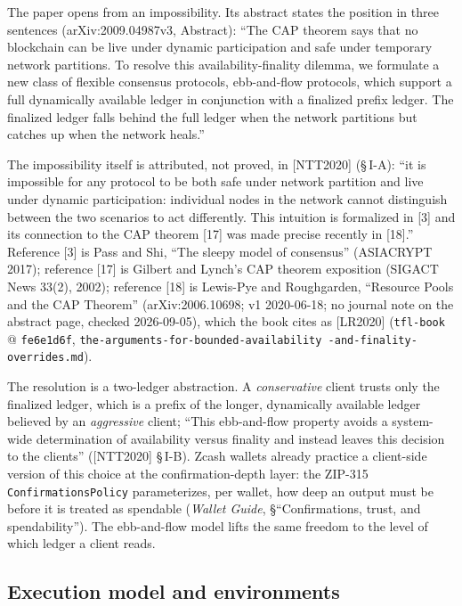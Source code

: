 \documentclass[11pt,a4paper]{article}
\theoremstyle{definition}
\begin{document}
The paper opens from an impossibility. Its abstract states the position in
three sentences (arXiv:2009.04987v3, Abstract): ``The CAP theorem says that
no blockchain can be live under dynamic participation and safe under
temporary network partitions. To resolve this availability-finality
dilemma, we formulate a new class of flexible consensus protocols,
ebb-and-flow protocols, which support a full dynamically available ledger
in conjunction with a finalized prefix ledger. The finalized ledger falls
behind the full ledger when the network partitions but catches up when the
network heals.''

The impossibility itself is attributed, not proved, in [NTT2020]
(\S\,I-A): ``it is impossible for any protocol to be both safe under
network partition and live under dynamic participation: individual nodes
in the network cannot distinguish between the two scenarios to act
differently. This intuition is formalized in [3] and its connection to the
CAP theorem [17] was made precise recently in [18].'' Reference [3] is
Pass and Shi, ``The sleepy model of consensus'' (ASIACRYPT 2017);
reference [17] is Gilbert and Lynch's CAP theorem exposition (SIGACT News
33(2), 2002); reference [18] is Lewis-Pye and Roughgarden, ``Resource
Pools and the CAP Theorem'' (arXiv:2006.10698; v1 2020-06-18; no journal
note on the abstract page, checked 2026-09-05), which the book cites as
[LR2020] (\texttt{tfl-book} @ \texttt{fe6e1d6f},
\texttt{the-arguments-for-bounded-availability\allowbreak
-and-finality-overrides.md}).

The resolution is a two-ledger abstraction. A \emph{conservative} client
trusts only the finalized ledger, which is a prefix of the longer,
dynamically available ledger believed by an \emph{aggressive} client;
``This ebb-and-flow property avoids a system-wide determination of
availability versus finality and instead leaves this decision to the
clients'' ([NTT2020] \S\,I-B). Zcash wallets already practice a
client-side version of this choice at the confirmation-depth layer: the
ZIP-315 \texttt{ConfirmationsPolicy} parameterizes, per wallet, how deep
an output must be before it is treated as spendable (\emph{Wallet Guide},
\S``Confirmations, trust, and spendability''). The ebb-and-flow model
lifts the same freedom to the level of which ledger a client reads.

\subsection{Execution model and environments}\label{sec:xl-execution}
\end{document}
